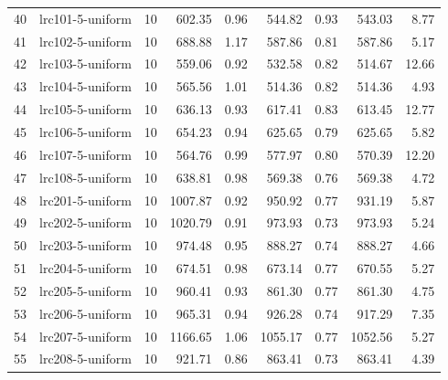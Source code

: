 \begin{tabular}{llrrrrrrr}
40 &  lrc101-5-uniform &         10 &             602.35 &           0.96 &             544.82 &           0.93 &                543.03 &       8.77 \\
41 &  lrc102-5-uniform &         10 &             688.88 &           1.17 &             587.86 &           0.81 &                587.86 &       5.17 \\
42 &  lrc103-5-uniform &         10 &             559.06 &           0.92 &             532.58 &           0.82 &                514.67 &      12.66 \\
43 &  lrc104-5-uniform &         10 &             565.56 &           1.01 &             514.36 &           0.82 &                514.36 &       4.93 \\
44 &  lrc105-5-uniform &         10 &             636.13 &           0.93 &             617.41 &           0.83 &                613.45 &      12.77 \\
45 &  lrc106-5-uniform &         10 &             654.23 &           0.94 &             625.65 &           0.79 &                625.65 &       5.82 \\
46 &  lrc107-5-uniform &         10 &             564.76 &           0.99 &             577.97 &           0.80 &                570.39 &      12.20 \\
47 &  lrc108-5-uniform &         10 &             638.81 &           0.98 &             569.38 &           0.76 &                569.38 &       4.72 \\
48 &  lrc201-5-uniform &         10 &            1007.87 &           0.92 &             950.92 &           0.77 &                931.19 &       5.87 \\
49 &  lrc202-5-uniform &         10 &            1020.79 &           0.91 &             973.93 &           0.73 &                973.93 &       5.24 \\
50 &  lrc203-5-uniform &         10 &             974.48 &           0.95 &             888.27 &           0.74 &                888.27 &       4.66 \\
51 &  lrc204-5-uniform &         10 &             674.51 &           0.98 &             673.14 &           0.77 &                670.55 &       5.27 \\
52 &  lrc205-5-uniform &         10 &             960.41 &           0.93 &             861.30 &           0.77 &                861.30 &       4.75 \\
53 &  lrc206-5-uniform &         10 &             965.31 &           0.94 &             926.28 &           0.74 &                917.29 &       7.35 \\
54 &  lrc207-5-uniform &         10 &            1166.65 &           1.06 &            1055.17 &           0.77 &               1052.56 &       5.27 \\
55 &  lrc208-5-uniform &         10 &             921.71 &           0.86 &             863.41 &           0.73 &                863.41 &       4.39 \\
\bottomrule
\end{tabular}
